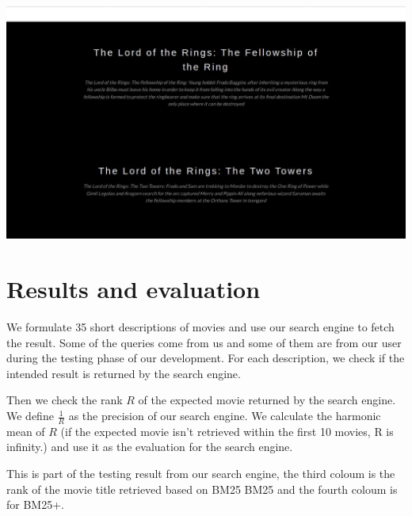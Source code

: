 \documentclass[letterpaper,10pt]{article}
\newenvironment{Figure}
  {\par\medskip\noindent\minipage{\linewidth}}
  {\endminipage\par\medskip}
\begin{document}
\begin{multicols}{2}
    \begin{Figure}
        \center
        \includegraphics[width=0.8\linewidth]{interface1.jpg}
    \end{Figure}

    \section{Results and evaluation}

    We formulate 35 short descriptions of movies and use our search engine to
    fetch the result.
    Some of the queries come from us and some of them are from our user during
    the testing phase of our development.
    For each description, we check if the intended result is returned by the
    search engine.

    Then we check the rank $R$ of the expected movie returned by the search
    engine.
    We define $\frac{1}{R}$ as the precision of our search engine.
    We calculate the harmonic mean of $R$ (if the expected movie isn’t retrieved
    within the first 10 movies, R is infinity.) and use it as the evaluation for
    the search engine.

    This is part of the testing result from our search engine, the third coloum
    is the rank of the movie title retrieved based on BM25 BM25 and the fourth
    coloum is for BM25+.


\end{multicols}
\end{document}
